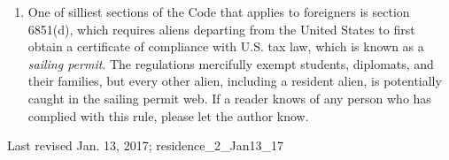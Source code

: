 \begin{enumerate}
		\item One of silliest sections of the Code that applies to foreigners is section 6851(d), which requires aliens departing from the United States to first obtain a certificate of compliance with U.S. tax law, which is known as a \emph{sailing permit}. The regulations mercifully exempt students, diplomats, and their families, but every other alien, including a resident alien, is potentially caught in the sailing permit web.  If a reader knows of any person who has complied with this rule, please let the author know.

	\end{enumerate}

\begin{framed}
	Last revised Jan. 13, 2017; residence\_2\_Jan13\_17
	\end{framed}
	
